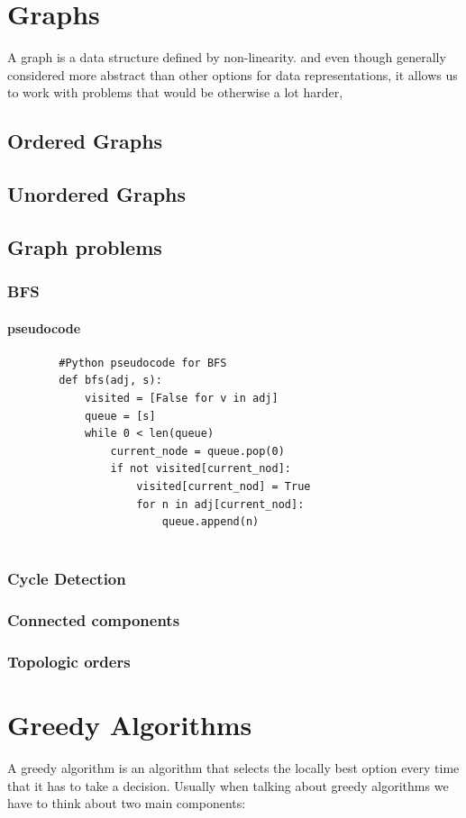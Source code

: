 \documentclass[12pt,a4paper,olive]{bbe}
\begin{document}
	\chapter{Graphs}
	A graph is a data structure defined by non-linearity. and even though
	generally considered more abstract than other options for data representations,
	it allows us to work with problems that would be otherwise a lot harder, 
	\section{Ordered Graphs}
	\section{Unordered Graphs}
	
	\section{Graph problems}
	
	\subsection{BFS}

	\subsubsection{pseudocode}
	\begin{verbatim}
		#Python pseudocode for BFS
		def bfs(adj, s):
		    visited = [False for v in adj]
		    queue = [s]
		    while 0 < len(queue)
		        current_node = queue.pop(0)
		        if not visited[current_nod]:
		            visited[current_nod] = True
		            for n in adj[current_nod]:
		                queue.append(n)
		            
	\end{verbatim}
	\subsection{Cycle Detection}
	\subsection{Connected components}
	\subsection{Topologic orders}

	\chapter{Greedy Algorithms}
	A greedy algorithm is an algorithm that selects the locally best option
	every time that it has to take a decision. Usually when talking about greedy
	algorithms we have to think about two main components:
\end{document}
